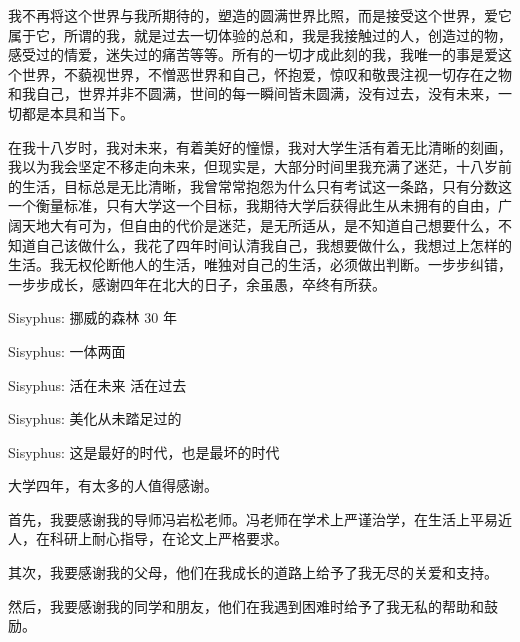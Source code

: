 \documentclass{pkuthesis}
\begin{document}
我不再将这个世界与我所期待的，塑造的圆满世界比照，而是接受这个世界，爱它属于它，所谓的我，就是过去一切体验的总和，我是我接触过的人，创造过的物，感受过的情爱，迷失过的痛苦等等。所有的一切才成此刻的我，我唯一的事是爱这个世界，不藐视世界，不憎恶世界和自己，怀抱爱，惊叹和敬畏注视一切存在之物和我自己，世界并非不圆满，世间的每一瞬间皆未圆满，没有过去，没有未来，一切都是本具和当下。

在我十八岁时，我对未来，有着美好的憧憬，我对大学生活有着无比清晰的刻画，我以为我会坚定不移走向未来，但现实是，大部分时间里我充满了迷茫，十八岁前的生活，目标总是无比清晰，我曾常常抱怨为什么只有考试这一条路，只有分数这一个衡量标准，只有大学这一个目标，我期待大学后获得此生从未拥有的自由，广阔天地大有可为，但自由的代价是迷茫，是无所适从，是不知道自己想要什么，不知道自己该做什么，我花了四年时间认清我自己，我想要做什么，我想过上怎样的生活。我无权伦断他人的生活，唯独对自己的生活，必须做出判断。一步步纠错，一步步成长，感谢四年在北大的日子，余虽愚，卒终有所获。

Sisyphus:
挪威的森林 30 年

Sisyphus:
一体两面

Sisyphus:
活在未来 活在过去

Sisyphus:
美化从未踏足过的

Sisyphus:
这是最好的时代，也是最坏的时代


大学四年，有太多的人值得感谢。

首先，我要感谢我的导师冯岩松老师。冯老师在学术上严谨治学，在生活上平易近人，在科研上耐心指导，在论文上严格要求。

其次，我要感谢我的父母，他们在我成长的道路上给予了我无尽的关爱和支持。

然后，我要感谢我的同学和朋友，他们在我遇到困难时给予了我无私的帮助和鼓励。
\end{document}

